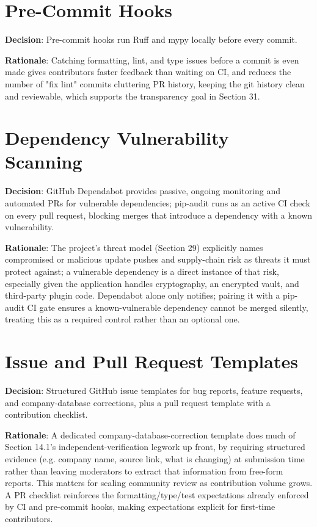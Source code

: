 \section{Pre-Commit Hooks}
\textbf{Decision}:  Pre-commit hooks run Ruff and mypy locally before every commit.

\textbf{Rationale}:  Catching formatting, lint, and type issues before a commit is even made gives contributors faster feedback than waiting on CI, and reduces the number of "fix lint" commits cluttering PR history, keeping the git history clean and reviewable, which supports the transparency goal in Section 31.
\section{Dependency Vulnerability Scanning}
\textbf{Decision}:  GitHub Dependabot provides passive, ongoing monitoring and automated PRs for vulnerable dependencies; pip-audit runs as an active CI check on every pull request, blocking merges that introduce a dependency with a known vulnerability.

\textbf{Rationale}:  The project's threat model (Section 29) explicitly names compromised or malicious update pushes and supply-chain risk as threats it must protect against; a vulnerable dependency is a direct instance of that risk, especially given the application handles cryptography, an encrypted vault, and third-party plugin code. Dependabot alone only notifies; pairing it with a pip-audit CI gate ensures a known-vulnerable dependency cannot be merged silently, treating this as a required control rather than an optional one.
\section{Issue and Pull Request Templates}
\textbf{Decision}:  Structured GitHub issue templates for bug reports, feature requests, and company-database corrections, plus a pull request template with a contribution checklist.

\textbf{Rationale}:  A dedicated company-database-correction template does much of Section 14.1's independent-verification legwork up front, by requiring structured evidence (e.g. company name, source link, what is changing) at submission time rather than leaving moderators to extract that information from free-form reports. This matters for scaling community review as contribution volume grows. A PR checklist reinforces the formatting/type/test expectations already enforced by CI and pre-commit hooks, making expectations explicit for first-time contributors.

\sentinelchapterend
